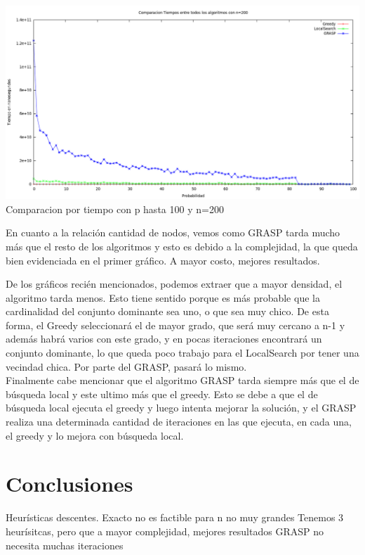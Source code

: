 \begin{center}
\includegraphics[width=17cm]{./graficos/comparaciontiemposprobvariablen200.png}\\
Comparacion por tiempo con p hasta 100 y n=200
\end{center}

En cuanto a la relación cantidad de nodos, vemos como GRASP tarda mucho más que el resto de los algoritmos 
y esto es debido a la complejidad, la que queda bien evidenciada en el primer gráfico. A mayor costo, mejores resultados.

De los gráficos recién mencionados, podemos extraer que a mayor densidad, el algoritmo tarda menos.
Esto tiene sentido porque es más probable que la cardinalidad del conjunto dominante sea uno, o que sea muy chico.
De esta forma, el Greedy seleccionará el de mayor grado, que será muy cercano a n-1 y además habrá varios con este grado, y en pocas iteraciones
encontrará un conjunto dominante, lo que queda poco trabajo para el LocalSearch por tener una vecindad chica.
Por parte del GRASP, pasará lo mismo.\\
Finalmente cabe mencionar que el algoritmo GRASP tarda siempre más que el de búsqueda local y este ultimo más que el
greedy. Esto se debe a que el de búsqueda local ejecuta el greedy y luego intenta mejorar la solución, y el GRASP realiza una
determinada cantidad de iteraciones en las que ejecuta, en cada una, el greedy y lo mejora con búsqueda local.


\section{Conclusiones}
Heurísticas descentes. Exacto no es factible para n no muy grandes
Tenemos 3 heurísitcas, pero que a mayor complejidad, mejores resultados
GRASP no necesita muchas iteraciones



